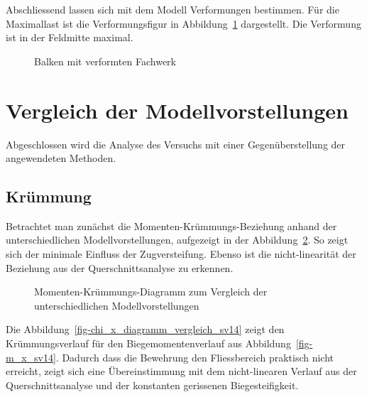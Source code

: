 \documentclass[
  12pt,
  letterpaper,
  egregdoesnotlikesansseriftitles]{scrreprt}
\begin{document}
Abschliessend lassen sich mit dem Modell Verformungen bestimmen. Für die
Maximallast ist die Verformungsfigur in
Abbildung~\ref{fig-verformung_fachwerk_sv14} dargestellt. Die Verformung
ist in der Feldmitte maximal.

\begin{figure}[H]


\caption{\label{fig-verformung_fachwerk_sv14}Balken mit verformten
Fachwerk}

\end{figure}%

\section{Vergleich der
Modellvorstellungen}\label{vergleich-der-modellvorstellungen-1}

Abgeschlossen wird die Analyse des Versuchs mit einer Gegenüberstellung
der angewendeten Methoden.

\subsection{Krümmung}\label{kruxfcmmung-1}

Betrachtet man zunächst die Momenten-Krümmungs-Beziehung anhand der
unterschiedlichen Modellvorstellungen, aufgezeigt in der
Abbildung~\ref{fig-mchi_diagramm_vergleich_sv14}. So zeigt sich der
minimale Einfluss der Zugversteifung. Ebenso ist die nicht-linearität
der Beziehung aus der Querschnittsanalyse zu erkennen.

\begin{figure}[H]


\caption{\label{fig-mchi_diagramm_vergleich_sv14}Momenten-Krümmungs-Diagramm
zum Vergleich der unterschiedlichen Modellvorstellungen}

\end{figure}%

Die Abbildung~\ref{fig-chi_x_diagramm_vergleich_sv14} zeigt den
Krümmungsverlauf für den Biegemomentenverlauf aus
Abbildung~\ref{fig-m_x_sv14}. Dadurch dass die Bewehrung den
Fliessbereich praktisch nicht erreicht, zeigt sich eine Übereinstimmung
mit dem nicht-linearen Verlauf aus der Querschnittsanalyse und der
konstanten gerissenen Biegesteifigkeit.
\end{document}
